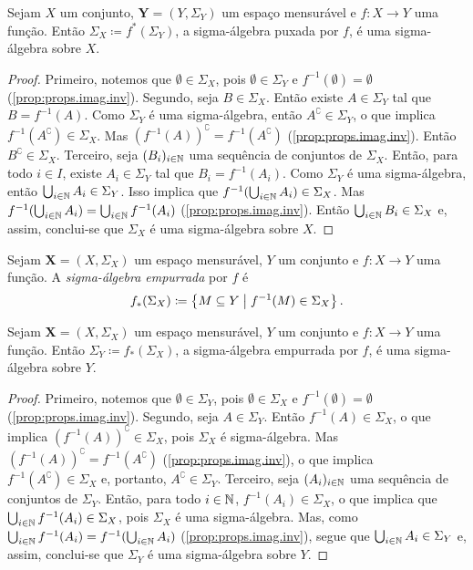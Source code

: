 \begin{prop}
Sejam $X$ um conjunto, $\bm Y = (Y,\Sigma_Y)$ um espaço mensurável e $f: X \to Y$ uma função. Então $\Sigma_X \coloneqq f^*(\Sigma_Y)$, a sigma-álgebra puxada por $f$, é uma sigma-álgebra sobre $X$.
\end{prop}
\begin{proof}
Primeiro, notemos que $\emptyset \in \Sigma_X$, pois $\emptyset \in \Sigma_Y$ e $f^{-1}(\emptyset) = \emptyset$ (\ref{prop:props.imag.inv}). Segundo, seja $B \in \Sigma_X$. Então existe $A \in \Sigma_Y$ tal que $B = f^{-1}(A)$. Como $\Sigma_Y$ é uma sigma-álgebra, então $A^\complement \in \Sigma_Y$, o que implica $f^{-1}(A^\complement) \in \Sigma_X$. Mas $(f^{-1}(A))^\complement = f^{-1}(A^\complement)$ (\ref{prop:props.imag.inv}). Então $B^\complement \in \Sigma_X$. Terceiro, seja $(B_i)_{i \in \mathbb{N}}$ uma sequência de conjuntos de $\Sigma_X$. Então, para todo $i \in I$, existe $A_i \in \Sigma_Y$ tal que $B_i = f^{-1}(A_i)$. Como $\Sigma_Y$ é uma sigma-álgebra, então $\bigcup_{i \in \mathbb{N}} A_i \in \Sigma_Y$. Isso implica que $f^{-1}(\bigcup_{i \in \mathbb{N}} A_i) \in \Sigma_X$. Mas $f^{-1}(\bigcup_{i \in \mathbb{N}} A_i) = \bigcup_{i \in \mathbb{N}} f^{-1}(A_i)$ (\ref{prop:props.imag.inv}). Então $\bigcup_{i \in \mathbb{N}} B_i \in \Sigma_X$ e, assim, conclui-se que $\Sigma_X$ é uma sigma-álgebra sobre $X$.
\end{proof}

\begin{defi}
Sejam $\bm X = (X,\Sigma_X)$ um espaço mensurável, $Y$ um conjunto e $f: X \to Y$ uma função. A \emph{sigma-álgebra empurrada} por $f$ é
	\begin{equation*}
	f_*(\Sigma_X) \coloneqq \set{M \subseteq Y}{f^{-1}(M) \in \Sigma_X}.
	\end{equation*}
\end{defi}

\begin{prop}
Sejam $\bm X = (X,\Sigma_X)$ um espaço mensurável, $Y$ um conjunto e $f: X \to Y$ uma função. Então $\Sigma_Y \coloneqq f_*(\Sigma_X)$, a sigma-álgebra empurrada por $f$, é uma sigma-álgebra sobre $Y$.
\end{prop}
\begin{proof}
Primeiro, notemos que $\emptyset \in \Sigma_Y$, pois $\emptyset \in \Sigma_X$ e $f^{-1}(\emptyset) = \emptyset$ (\ref{prop:props.imag.inv}). Segundo, seja $A \in \Sigma_Y$. Então $f^{-1}(A) \in \Sigma_ X$, o que implica $(f^{-1}(A))^\complement \in \Sigma_ X$, pois $\Sigma_ X$ é sigma-álgebra. Mas $(f^{-1}(A))^\complement = f^{-1}(A^\complement)$ (\ref{prop:props.imag.inv}), o que implica $f^{-1}(A^\complement) \in \Sigma_ X$ e, portanto, $A^\complement \in \Sigma_ Y$. Terceiro, seja $(A_i)_{i \in \mathbb{N}}$ uma sequência de conjuntos de $\Sigma_ Y$. Então, para todo $i \in \mathbb{N}$, $f^{-1}(A_i) \in \Sigma_ X$, o que implica que $\bigcup_{i \in \mathbb{N}} f^{-1}(A_i) \in \Sigma_ X$, pois $\Sigma_ X$ é uma sigma-álgebra. Mas, como $\bigcup_{i \in \mathbb{N}} f^{-1}(A_i) = f^{-1}(\bigcup_{i \in \mathbb{N}} A_i)$ (\ref{prop:props.imag.inv}), segue que $\bigcup_{i \in \mathbb{N}} A_i \in \Sigma_ Y$ e, assim, conclui-se que $\Sigma_ Y$ é uma sigma-álgebra sobre $Y$.
\end{proof}

